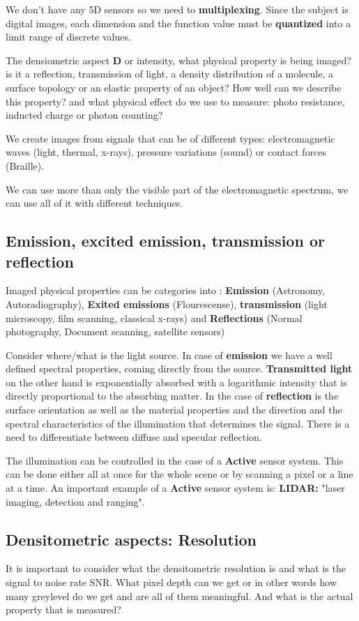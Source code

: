 We don't have any 5D sensors so we need to \textbf{multiplexing}. Since the subject is digital images, each dimension and the function value must be \textbf{quantized} into a limit range of discrete values. 

The densiometric aspect \textbf{D} or intensity, what physical property is being imaged? is it a reflection, transmission of light, a density distribution of a molecule, a surface topology or an elastic property of an object? How well can we describe this property? and what physical effect do we use to measure: photo resistance, inducted charge or photon counting? 

We create images from signals that can be of different types: electromagnetic waves (light, thermal, x-rays), pressure variations (sound) or contact forces (Braille).

We can use more than only the visible part of the electromagnetic spectrum, we can use all of it with different techniques. 

\subsection{Emission, excited emission, transmission or reflection}
Imaged physical properties can be categories into : \textbf{Emission} (Astronomy, Autoradiography), \textbf{Exited emissions} (Flourescense), \textbf{transmission} (light microscopy, film scanning, classical x-rays) and \textbf{Reflections} (Normal photography, Document scanning, satellite sensors)

Consider where/what is the light source. In case of \textbf{emission} we have a well defined spectral properties, coming directly from the source. \textbf{Transmitted light} on the other hand is exponentially absorbed with a logarithmic intensity that is directly proportional to the absorbing matter. In the case of \textbf{reflection} is the surface orientation as well as the material properties and the direction and the spectral characteristics of the illumination that determines the signal. There is a need to differentiate between diffuse and specular reflection. 

The illumination can be controlled in the case of a \textbf{Active} sensor system. This can be done either all at once for the whole scene or by scanning a pixel or a line at a time. An important example of a \textbf{Active} sensor system is: \textbf{LIDAR:} "laser imaging, detection and ranging".

\subsection{Densitometric aspects: Resolution}
It is important to consider what the densitometric resolution is and what is the signal to noise rate SNR. What pixel depth can we get or in other words how many greylevel do we get and are all of them meaningful. And what is the actual property that is measured? 

